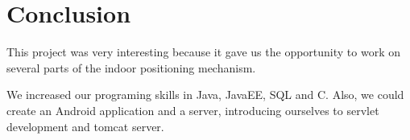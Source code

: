\section{Conclusion}

This project was very interesting because it gave us the opportunity to work on
several parts of the indoor positioning mechanism.

We increased our programing skills in Java, JavaEE, SQL and C. Also, we could create an
Android application and a server, introducing ourselves to servlet development
and tomcat server.
